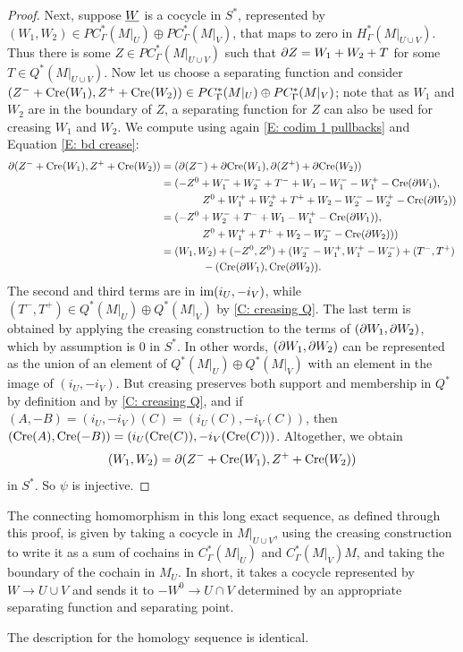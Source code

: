 \begin{proof}
	Next, suppose $\underline{W}$ is a cocycle in $S^*$, represented by $(W_1,W_2) \in PC^*_\Gamma(M|_U) \oplus PC^*_\Gamma(M|_V)$, that maps to zero in $H_{\Gamma}^*(M|_{U \cup V})$.
	Thus there is
	some $Z \in PC^*_\Gamma(M|_{U \cup V})$ such that $\partial Z = W_1+W_2+T$ for some $T \in Q^*(M|_{U \cup V})$.
	Now let us choose a separating function and consider $(Z^-+\mathrm{Cre}(W_1),Z^++\mathrm{Cre}(W_2)) \in PC^*_\Gamma(M|_U) \oplus PC^*_\Gamma(M|_V)$; note that as $W_1$ and $W_2$ are in the boundary of $Z$, a separating function for $Z$ can also be used for creasing $W_1$ and $W_2$.
	We compute using again \cref{E: codim 1 pullbacks} and Equation \eqref{E: bd crease}:
	\begin{align*}
		\partial (Z^-+\mathrm{Cre}(W_1),Z^++\mathrm{Cre}(W_2))& = (\partial (Z^-)+\partial \mathrm{Cre}(W_1),\partial (Z^+)+\partial\mathrm{Cre}(W_2))\\
		& = (-Z^0 + W_1^- + W_2^- + T^-+W_1 -W_1^- -W_1^+ -\mathrm{Cre}(\partial W_1),\\
		&\qquad\qquad Z^0+ W_1^++ W_2^+ + T^++W_2 -W_2^- -W_2^+ -\mathrm{Cre}(\partial W_2))\\
		& = (-Z^0 + W_2^- + T^-+W_1 -W_1^+ -\mathrm{Cre}(\partial W_1)),\\
		&\qquad\qquad Z^0+ W_1^+ + T^++W_2 -W_2^- -\mathrm{Cre}(\partial W_2)))\\
		& = (W_1,W_2)+ (-Z^0,Z^0) + (W_2^--W_1^+, W_1^+ -W_2^-) + (T^-,T^+)\\
		&\qquad\qquad -(\mathrm{Cre}(\partial W_1),\mathrm{Cre}(\partial W_2)).
	\end{align*}
	The second and third terms are in $\text{im}(i_U,-i_V)$, while $(T^-,T^+) \in Q^*(M|_U) \oplus Q^*(M|_V)$ by \cref{C: creasing Q}.
	The last term is obtained by applying the creasing construction to the terms of $(\partial W_1,\partial W_2)$, which by assumption is $0$ in $S^*$.
	In other words, $(\partial W_1,\partial W_2)$ can be represented as the union of an element of $Q^*(M|_U) \oplus Q^*(M|_V)$ with an element in the image of $(i_U,-i_V)$.
	But creasing preserves both support and membership in $Q^*$ by definition and by \cref{C: creasing Q}, and if $(A,-B) = (i_U,-i_V)(C) = (i_U(C),-i_V(C))$, then $(\mathrm{Cre}(A),\mathrm{Cre}(-B)) = (i_U(\mathrm{Cre}(C)),-i_V(\mathrm{Cre}(C)))$.
	Altogether, we obtain $$(W_1,W_2) = \partial (Z^-+\mathrm{Cre}(W_1),Z^++\mathrm{Cre}(W_2))$$ in $S^*$.
	So $\psi$ is injective.
\end{proof}

\begin{remark}\label{R: MV boundary}
	The connecting homomorphism in this long exact sequence, as defined through this proof, is given by taking a cocycle in $M|_{U \cup V}$,
	using the creasing construction to write it as a sum of cochains in $C^*_\Gamma(M|_{U})$ and $C^*_\Gamma(M|_{V})M$, and taking the boundary of the cochain in $M_U$.
	In short, it takes a cocycle represented by $W \to U \cup V$ and sends it to $-W^0 \to U \cap V$ determined by an appropriate separating function and separating point.

	The description for the homology sequence is identical.
\end{remark}


